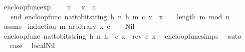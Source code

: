 \begin{isabellebody}
\begin{isamarkuptext}
\end{isamarkuptext}\isamarkuptrue%
\isamarkupfalse%
\ enc{\isacharunderscore}{\kern0pt}loop{\isacharunderscore}{\kern0pt}func{\isacharunderscore}{\kern0pt}exp{\isacharcolon}{\kern0pt}\ \isanewline
\ \ \ {\isachardoublequoteopen}n\ {\isachargreater}{\kern0pt}\ {}{\isachardoublequoteclose}\ {\isachardoublequoteopen}x\ {\isacharless}{\kern0pt}\ n{\isachardoublequoteclose}\isanewline
\ \ \ {\isachardoublequoteopen}snd\ {\isacharparenleft}{\kern0pt}enc{\isacharunderscore}{\kern0pt}loop{\isacharunderscore}{\kern0pt}func\ {\isacharparenleft}{\kern0pt}nat{\isacharunderscore}{\kern0pt}to{\isacharunderscore}{\kern0pt}bitstring\ h{\isacharcomma}{\kern0pt}\ n{\isacharcomma}{\kern0pt}\ h{\isacharcomma}{\kern0pt}\ m{\isacharparenright}{\kern0pt}\ c\ x{\isacharparenright}{\kern0pt}\ {\isacharequal}{\kern0pt}\ x\ {\isacharcircum}{\kern0pt}\ {\isacharparenleft}{\kern0pt}{}\ {\isacharcircum}{\kern0pt}\ {\isacharparenleft}{\kern0pt}length\ m{\isacharparenright}{\kern0pt}{\isacharparenright}{\kern0pt}\ mod\ n{\isachardoublequoteclose}\isanewline
%
\isadelimproof
\ \ %
\endisadelimproof
%
\isatagproof
{}\isamarkupfalse%
\ assms\isanewline
{}\isamarkupfalse%
\ {\isacharparenleft}{\kern0pt}induction\ m\ arbitrary{\isacharcolon}{\kern0pt}\ x\ c{\isacharparenright}{\kern0pt}\isanewline
\ \ \isamarkupfalse%
\ Nil\isanewline
\ \ \isamarkupfalse%
\ \isamarkupfalse%
\ {\isachardoublequoteopen}{\isacharparenleft}{\kern0pt}enc{\isacharunderscore}{\kern0pt}loop{\isacharunderscore}{\kern0pt}func\ {\isacharparenleft}{\kern0pt}nat{\isacharunderscore}{\kern0pt}to{\isacharunderscore}{\kern0pt}bitstring\ h{\isacharcomma}{\kern0pt}\ n{\isacharcomma}{\kern0pt}\ h{\isacharcomma}{\kern0pt}\ {\isacharbrackleft}{\kern0pt}{\isacharbrackright}{\kern0pt}{\isacharparenright}{\kern0pt}\ c\ x{\isacharparenright}{\kern0pt}\ {\isacharequal}{\kern0pt}\ {\isacharparenleft}{\kern0pt}rev\ c{\isacharcomma}{\kern0pt}\ x{\isacharparenright}{\kern0pt}{\isachardoublequoteclose}\ \isamarkupfalse%
\ enc{\isacharunderscore}{\kern0pt}loop{\isacharunderscore}{\kern0pt}func{\isachardot}{\kern0pt}simps{\isacharparenleft}{\kern0pt}{}{\isacharparenright}{\kern0pt}\ \isamarkupfalse%
\ auto\isanewline
\ \ \isamarkupfalse%
\ \isamarkupfalse%
\ {\isacharquery}{\kern0pt}case\ \isamarkupfalse%
\ local{\isachardot}{\kern0pt}Nil{\isacharparenleft}{\kern0pt}{}{\isacharparenright}{\kern0pt}\ \isamarkupfalse%

\end{isabellebody}
